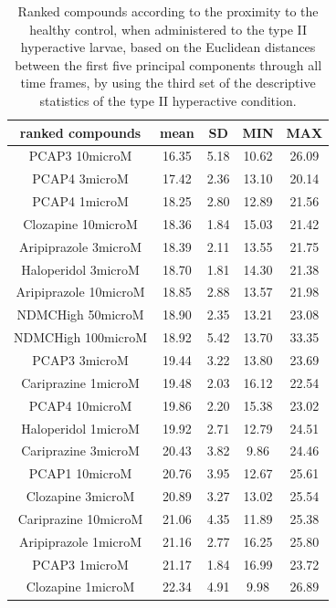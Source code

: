 \documentclass[a4paper,12pt]{article}
\begin{document}
\begin{table}[h!]\tiny
\centering
\caption{Ranked compounds according to the proximity to the healthy control, when administered to the type II hyperactive larvae, based on the Euclidean distances between the first five principal components through all time frames, by using the third set of the descriptive statistics of the type II hyperactive condition.}
\begin{tabular}{|c|c|c|c|c|}
\hline
ranked compounds             & mean & SD   & MIN  & MAX   \\ \hline
PCAP3 10microM      & 16.35 & 5.18 & 10.62 & 26.09 \\ \hline
PCAP4 3microM       & 17.42 & 2.36 & 13.10  & 20.14 \\ \hline
PCAP4 1microM       & 18.25 & 2.80  & 12.89 & 21.56 \\ \hline
Clozapine 10microM    & 18.36 & 1.84 & 15.03 & 21.42 \\ \hline
Aripiprazole 3microM  & 18.39 & 2.11 & 13.55 & 21.75 \\ \hline
Haloperidol 3microM   & 18.70  & 1.81 & 14.30  & 21.38 \\ \hline
Aripiprazole 10microM & 18.85 & 2.88 & 13.57 & 21.98 \\ \hline
NDMCHigh 50microM     & 18.90  & 2.35 & 13.21 & 23.08 \\ \hline
NDMCHigh 100microM    & 18.92 & 5.42 & 13.70  & 33.35 \\ \hline
PCAP3 3microM       & 19.44 & 3.22 & 13.80  & 23.69 \\ \hline
Cariprazine 1microM   & 19.48 & 2.03 & 16.12 & 22.54 \\ \hline
PCAP4 10microM      & 19.86 & 2.20  & 15.38 & 23.02 \\ \hline
Haloperidol 1microM   & 19.92 & 2.71 & 12.79 & 24.51 \\ \hline
Cariprazine 3microM   & 20.43 & 3.82 & 9.86  & 24.46 \\ \hline
PCAP1 10microM        & 20.76 & 3.95 & 12.67 & 25.61 \\ \hline
Clozapine 3microM     & 20.89 & 3.27 & 13.02 & 25.54 \\ \hline
Cariprazine 10microM  & 21.06 & 4.35 & 11.89 & 25.38 \\ \hline
Aripiprazole 1microM  & 21.16 & 2.77 & 16.25 & 25.80  \\ \hline
PCAP3 1microM       & 21.17 & 1.84 & 16.99 & 23.72 \\ \hline
Clozapine 1microM     & 22.34 & 4.91 & 9.98  & 26.89 \\ \hline

\end{tabular}
\end{table}
\end{document}

